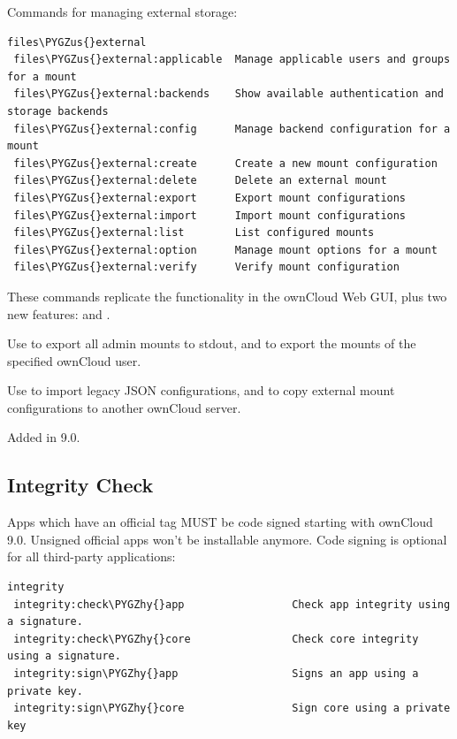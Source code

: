 \documentclass[letterpaper,10pt,english]{sphinxmanual}
\def\PYGZus{\char`\_}
\def\PYGZhy{\char`\-}
\begin{document}
Commands for managing external storage:

\begin{Verbatim}[commandchars=\\\{\}]
files\PYGZus{}external
 files\PYGZus{}external:applicable  Manage applicable users and groups for a mount
 files\PYGZus{}external:backends    Show available authentication and storage backends
 files\PYGZus{}external:config      Manage backend configuration for a mount
 files\PYGZus{}external:create      Create a new mount configuration
 files\PYGZus{}external:delete      Delete an external mount
 files\PYGZus{}external:export      Export mount configurations
 files\PYGZus{}external:import      Import mount configurations
 files\PYGZus{}external:list        List configured mounts
 files\PYGZus{}external:option      Manage mount options for a mount
 files\PYGZus{}external:verify      Verify mount configuration
\end{Verbatim}

These commands replicate the functionality in the ownCloud Web GUI, plus two new
features:   and .

Use  to export all admin mounts to stdout, and
 to export the mounts of the specified
ownCloud user.

Use  to import legacy JSON configurations,
and to copy external mount configurations to another ownCloud server.

Added in 9.0.


\subsection{Integrity Check}
\label{configuration_server/occ_command:integrity-check}\label{configuration_server/occ_command:integrity-check-label}
Apps which have an official tag MUST be code signed starting with ownCloud 9.0. Unsigned official apps won't be installable anymore. Code signing is optional for all third-party applications:

\begin{Verbatim}[commandchars=\\\{\}]
integrity
 integrity:check\PYGZhy{}app                 Check app integrity using a signature.
 integrity:check\PYGZhy{}core                Check core integrity using a signature.
 integrity:sign\PYGZhy{}app                  Signs an app using a private key.
 integrity:sign\PYGZhy{}core                 Sign core using a private key
\end{Verbatim}
\end{document}
